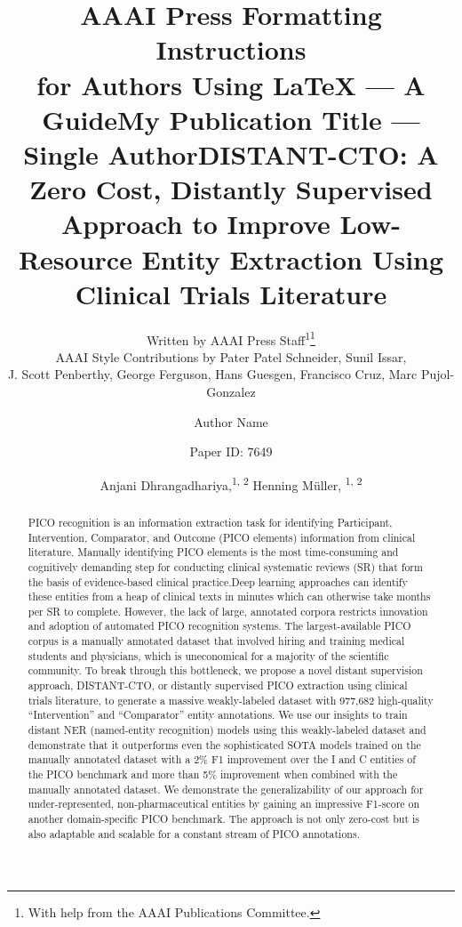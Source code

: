 \documentclass[letterpaper]{article} %
\title{AAAI Press Formatting Instructions \\for Authors Using \LaTeX{} --- A Guide}
\author{
    Written by AAAI Press Staff\textsuperscript{\rm 1}\thanks{With help from the AAAI Publications Committee.}\\
    AAAI Style Contributions by Pater Patel Schneider,
    Sunil Issar,\\
    J. Scott Penberthy,
    George Ferguson,
    Hans Guesgen,
    Francisco Cruz\equalcontrib,
    Marc Pujol-Gonzalez\equalcontrib
}
\title{My Publication Title --- Single Author}
\author {
    Author Name
}
\title{DISTANT-CTO: A Zero Cost, Distantly Supervised Approach to Improve Low-Resource Entity Extraction Using Clinical Trials Literature}
\author {
    Paper ID: 7649
}
\author {
    Anjani Dhrangadhariya,\textsuperscript{\rm 1, 2}
    Henning M\"uller, \textsuperscript{\rm 1, 2}
}
\begin{document}
\maketitle

\begin{abstract}
PICO recognition is an information extraction task for identifying Participant, Intervention, Comparator, and Outcome (PICO elements) information from clinical literature.
Manually identifying PICO elements is the most time-consuming and cognitively demanding step for conducting clinical systematic reviews (SR) that form the basis of evidence-based clinical practice.Deep learning approaches can identify these entities from a heap of clinical texts in minutes which can otherwise take months per SR to complete.
However, the lack of large, annotated corpora restricts innovation and adoption of automated PICO recognition systems.
The largest-available PICO corpus is a manually annotated dataset that involved hiring and training medical students and physicians, which is uneconomical for a majority of the scientific community.
To break through this bottleneck, we propose a novel distant supervision approach, DISTANT-CTO, or distantly supervised PICO extraction using clinical trials literature, to generate a massive weakly-labeled dataset with 977,682 high-quality ``Intervention'' and ``Comparator'' entity annotations.
We use our insights to train distant NER (named-entity recognition) models using this weakly-labeled dataset and demonstrate that it outperforms even the sophisticated SOTA models trained on the manually annotated dataset with a 2\% F1 improvement over the I and C entities of the PICO benchmark and more than 5\% improvement when combined with the manually annotated dataset.
We demonstrate the generalizability of our approach for under-represented, non-pharmaceutical entities by gaining an impressive F1-score on another domain-specific PICO benchmark.
The approach is not only zero-cost but is also adaptable and scalable for a constant stream of PICO annotations.
\end{abstract}
%
\end{document}

